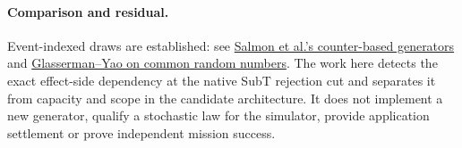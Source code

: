 \documentclass[11pt]{article}
\begin{document}
\paragraph{Comparison and residual.}
Event-indexed draws are established: see
\href{https://random123.com/}{Salmon et al.'s counter-based generators}
and \href{https://business.columbia.edu/sites/default/files-efs/pubfiles/4261/glasserman_yao_guidelines.pdf}{Glasserman--Yao on common random numbers}.
The work here detects the exact effect-side dependency at the native
SubT rejection cut and separates it from capacity and scope in the
candidate architecture. It does not implement a new generator,
qualify a stochastic law for the simulator, provide application
settlement or prove independent mission success.
\end{document}
